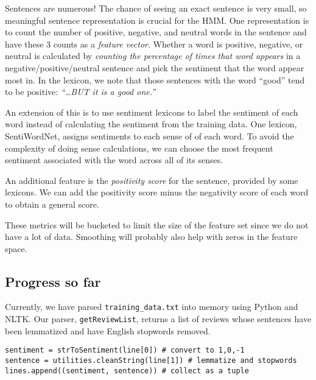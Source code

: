 \documentclass{article}
\begin{document}
\begin{itemize}
Sentences are numerous! The chance of seeing an exact sentence is very small, so meaningful sentence representation is crucial for the HMM. One representation is to count the number of positive, negative, and neutral words in the sentence and have these 3 counts as a \emph{feature vector}. Whether a word is positive, negative, or neutral is calculated by \emph{counting the percentage of times that word appears} in a negative/positive/neutral sentence and pick the sentiment that the word appear most in. In the lexicon, we note that those sentences with the word ``good'' tend to be positive: \emph{``\ldots BUT it is a good one.''}

An extension of this is to use sentiment lexicons to label the sentiment of each word instead of calculating the sentiment from the training data. One lexicon, SentiWordNet, assigns sentiments to each sense of of each word. To avoid the complexity of doing sense calculations, we can choose the most frequent sentiment associated with the word across all of its senses.

An additional feature is the \emph{positivity score} for the sentence, provided by some lexicons. We can add the positivity score minus the negativity score of each word to obtain a general score.

These metrics will be bucketed to limit the size of the feature set since we do not have a lot of data. Smoothing will probably also help with zeros in the feature space.
\end{itemize}
\subsection*{Progress so far}
Currently, we have parsed \texttt{training\_data.txt} into memory using Python and NLTK. Our parser, \texttt{getReviewList}, returns a list of reviews whose sentences have been lemmatized and have English stopwords removed.
\begin{verbatim}
sentiment = strToSentiment(line[0]) # convert to 1,0,-1
sentence = utilities.cleanString(line[1]) # lemmatize and stopwords
lines.append((sentiment, sentence)) # collect as a tuple
\end{verbatim}
\end{document}
